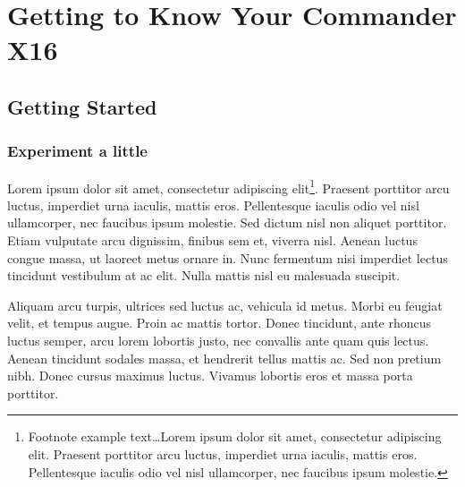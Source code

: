 
\makeatletter\@openrightfalse
\part{Getting to Know Your Commander X16}



\chapter{Getting Started}

\section{Experiment a little}

Lorem ipsum dolor sit amet, consectetur adipiscing elit\footnote{Footnote
example text\ldots Lorem ipsum dolor sit amet, consectetur adipiscing elit.
Praesent porttitor arcu luctus, imperdiet urna iaculis, mattis eros.
Pellentesque iaculis odio vel nisl ullamcorper, nec faucibus ipsum molestie.}.
Praesent porttitor arcu luctus, imperdiet urna iaculis, mattis eros.
Pellentesque iaculis odio vel nisl ullamcorper, nec faucibus ipsum molestie.
Sed dictum nisl non aliquet porttitor. Etiam vulputate arcu dignissim, finibus
sem et, viverra nisl. Aenean luctus congue massa, ut laoreet metus ornare in.
Nunc fermentum nisi imperdiet lectus tincidunt vestibulum at ac elit. Nulla
mattis nisl eu malesuada suscipit.

Aliquam arcu turpis, ultrices sed luctus ac, vehicula id metus. Morbi eu
feugiat velit, et tempus augue. Proin ac mattis tortor. Donec tincidunt, ante
rhoncus luctus semper, arcu lorem lobortis justo, nec convallis ante quam quis
lectus. Aenean tincidunt sodales massa, et hendrerit tellus mattis ac. Sed non
pretium nibh. Donec cursus maximus luctus. Vivamus lobortis eros et massa porta
porttitor.

